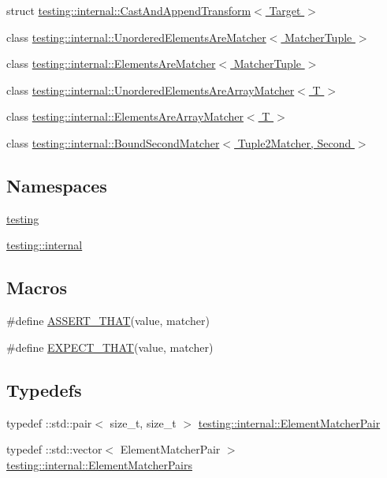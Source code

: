 \begin{DoxyCompactItemize}
\item 
struct \hyperlink{structtesting_1_1internal_1_1_cast_and_append_transform}{testing\+::internal\+::\+Cast\+And\+Append\+Transform$<$ Target $>$}
\item 
class \hyperlink{classtesting_1_1internal_1_1_unordered_elements_are_matcher}{testing\+::internal\+::\+Unordered\+Elements\+Are\+Matcher$<$ Matcher\+Tuple $>$}
\item 
class \hyperlink{classtesting_1_1internal_1_1_elements_are_matcher}{testing\+::internal\+::\+Elements\+Are\+Matcher$<$ Matcher\+Tuple $>$}
\item 
class \hyperlink{classtesting_1_1internal_1_1_unordered_elements_are_array_matcher}{testing\+::internal\+::\+Unordered\+Elements\+Are\+Array\+Matcher$<$ T $>$}
\item 
class \hyperlink{classtesting_1_1internal_1_1_elements_are_array_matcher}{testing\+::internal\+::\+Elements\+Are\+Array\+Matcher$<$ T $>$}
\item 
class \hyperlink{classtesting_1_1internal_1_1_bound_second_matcher}{testing\+::internal\+::\+Bound\+Second\+Matcher$<$ Tuple2\+Matcher, Second $>$}
\end{DoxyCompactItemize}
\subsection*{Namespaces}
\begin{DoxyCompactItemize}
\item 
 \hyperlink{namespacetesting}{testing}
\item 
 \hyperlink{namespacetesting_1_1internal}{testing\+::internal}
\end{DoxyCompactItemize}
\subsection*{Macros}
\begin{DoxyCompactItemize}
\item 
\#define \hyperlink{gmock-matchers_8h_a41d888579850c16583baea33ee8d057e}{A\+S\+S\+E\+R\+T\+\_\+\+T\+H\+AT}(value,  matcher)
\item 
\#define \hyperlink{gmock-matchers_8h_ac31e206123aa702e1152bb2735b31409}{E\+X\+P\+E\+C\+T\+\_\+\+T\+H\+AT}(value,  matcher)
\end{DoxyCompactItemize}
\subsection*{Typedefs}
\begin{DoxyCompactItemize}
\item 
typedef \+::std\+::pair$<$ size\+\_\+t, size\+\_\+t $>$ \hyperlink{namespacetesting_1_1internal_a109863545f08651178bf0f520aebd33b}{testing\+::internal\+::\+Element\+Matcher\+Pair}
\item 
typedef \+::std\+::vector$<$ Element\+Matcher\+Pair $>$ \hyperlink{namespacetesting_1_1internal_a0038618710c01a71150887dc7cfb0a29}{testing\+::internal\+::\+Element\+Matcher\+Pairs}
\end{DoxyCompactItemize}
